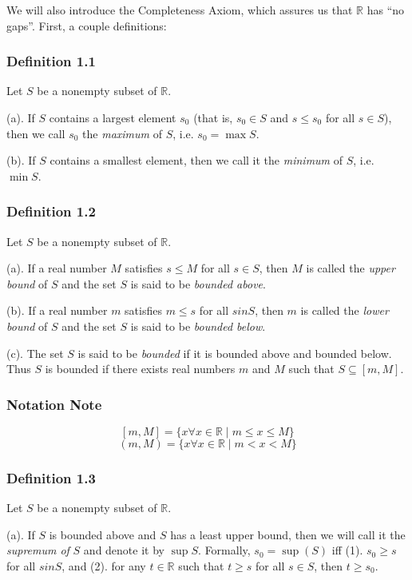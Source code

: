 \documentclass[]{article}
\begin{document}
We will also introduce the Completeness Axiom, which assures us that
$\mathbb{R}$ has ``no gaps''. First, a couple definitions:

\subsubsection{Definition 1.1}

Let $S$ be a nonempty subset of $\mathbb{R}$.

(a). If $S$ contains a largest element $s_0$ (that is, $s_0 \in S$ and
$s \le s_0$ for all $s \in S$), then we call $s_0$ the \emph{maximum} of
$S$, i.e. $s_0 = \max S$.

(b). If $S$ contains a smallest element, then we call it the
\emph{minimum} of $S$, i.e. $\min S$.

\subsubsection{Definition 1.2}

Let $S$ be a nonempty subset of $\mathbb{R}$.

(a). If a real number $M$ satisfies $s \le M$ for all $s \in S$, then
$M$ is called the \emph{upper bound} of $S$ and the set $S$ is said to
be \emph{bounded above}.

(b). If a real number $m$ satisfies $m \le s$ for all $s in S$, then $m$
is called the \emph{lower bound} of $S$ and the set $S$ is said to be
\emph{bounded below}.

(c). The set $S$ is said to be \emph{bounded} if it is bounded above and
bounded below. Thus $S$ is bounded if there exists real numbers $m$ and
$M$ such that $S \subseteq [m,M]$.

\subsubsection{Notation Note}

\[ [m,M] = \{x \forall x \in \mathbb{R} \mid m \le x \le M \} \]
\[ (m,M) = \{x \forall x \in \mathbb{R} \mid m < x < M \} \]

\subsubsection{Definition 1.3}

Let $S$ be a nonempty subset of $\mathbb{R}$.

(a). If $S$ is bounded above and $S$ has a least upper bound, then we
will call it the \emph{supremum of} $S$ and denote it by $\sup S$.
Formally, $s_0 = \sup(S)$ iff (1). $s_0 \ge s$ for all $s in S$, and
(2). for any $t \in \mathbb{R}$ such that $t \ge s$ for all $s \in S$,
then $t \ge s_0$.
\end{document}
